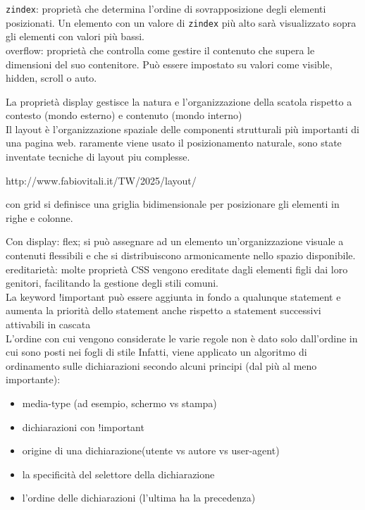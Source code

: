 \documentclass[12pt]{article}
\begin{document}
    \texttt{z\-index}: proprietà che determina l'ordine di sovrapposizione degli elementi posizionati. Un elemento con un valore di \texttt{z\-index} più alto sarà visualizzato sopra gli elementi con valori più bassi.\\
    
    overflow: proprietà che controlla come gestire il contenuto che supera le dimensioni del suo contenitore. Può essere impostato su valori come visible, hidden, scroll o auto.

La proprietà display gestisce la natura e l'organizzazione della scatola
rispetto a contesto (mondo esterno) e contenuto (mondo interno)\\

Il layout è l'organizzazione spaziale delle componenti strutturali
più importanti di una pagina web. raramente viene usato il posizionamento naturale, sono state inventate tecniche di layout piu complesse.

http://www.fabiovitali.it/TW/2025/layout/

con grid si definisce una griglia bidimensionale per posizionare gli elementi in righe e colonne.

Con display: flex; si può assegnare ad un elemento
un'organizzazione visuale a contenuti flessibili e che si
distribuiscono armonicamente nello spazio disponibile.\\

ereditarietà: molte proprietà CSS vengono ereditate dagli elementi figli dai loro genitori, facilitando la gestione degli stili comuni.\\


La keyword !important può essere aggiunta in fondo a
qualunque statement e aumenta la priorità dello statement
anche rispetto a statement successivi attivabili in cascata\\

L’ordine con cui vengono considerate le varie regole non
è dato solo dall’ordine in cui sono posti nei fogli di stile
Infatti, viene applicato un algoritmo di ordinamento
sulle dichiarazioni secondo alcuni principi (dal più al
meno importante):
\begin{itemize}
    \item media-type (ad esempio, schermo vs stampa)
    \item dichiarazioni con !important
    \item origine di una dichiarazione(utente vs autore vs user-agent)
    \item la specificità del selettore della dichiarazione
    \item l'ordine delle dichiarazioni (l'ultima ha la precedenza)
   
    \end{itemize}
\end{document}
